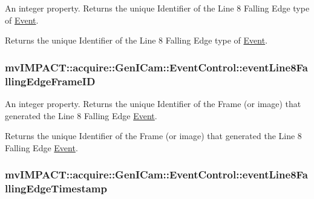 An integer property. Returns the unique Identifier of the Line 8 Falling Edge type of \hyperlink{classmv_i_m_p_a_c_t_1_1acquire_1_1_event}{Event}. 

Returns the unique Identifier of the Line 8 Falling Edge type of \hyperlink{classmv_i_m_p_a_c_t_1_1acquire_1_1_event}{Event}. \hypertarget{classmv_i_m_p_a_c_t_1_1acquire_1_1_gen_i_cam_1_1_event_control_aa894cda89683f6bd7b84bf6273f4395e}{
\subsubsection[{event\+Line8\+Falling\+Edge\+Frame\+I\+D}]{ mv\+I\+M\+P\+A\+C\+T\+::acquire\+::\+Gen\+I\+Cam\+::\+Event\+Control\+::event\+Line8\+Falling\+Edge\+Frame\+I\+D}}\label{classmv_i_m_p_a_c_t_1_1acquire_1_1_gen_i_cam_1_1_event_control_aa894cda89683f6bd7b84bf6273f4395e}


An integer property. Returns the unique Identifier of the Frame (or image) that generated the Line 8 Falling Edge \hyperlink{classmv_i_m_p_a_c_t_1_1acquire_1_1_event}{Event}. 

Returns the unique Identifier of the Frame (or image) that generated the Line 8 Falling Edge \hyperlink{classmv_i_m_p_a_c_t_1_1acquire_1_1_event}{Event}. \hypertarget{classmv_i_m_p_a_c_t_1_1acquire_1_1_gen_i_cam_1_1_event_control_ae08581ed15befce57be75feb11c33cdc}{
\subsubsection[{event\+Line8\+Falling\+Edge\+Timestamp}]{ mv\+I\+M\+P\+A\+C\+T\+::acquire\+::\+Gen\+I\+Cam\+::\+Event\+Control\+::event\+Line8\+Falling\+Edge\+Timestamp}}\label{classmv_i_m_p_a_c_t_1_1acquire_1_1_gen_i_cam_1_1_event_control_ae08581ed15befce57be75feb11c33cdc}


